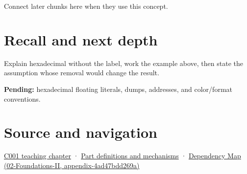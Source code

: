 Connect later chunks here when they use this concept.

\section{Recall and next depth}\label{appendix-6b8075763724-recall-and-next-depth}

Explain hexadecimal without the label, work the example above, then state the assumption whose removal would change the result.

\textbf{Pending:} hexadecimal floating literals, dumps, addresses, and color/format conventions.

\section{Source and navigation}\label{appendix-6b8075763724-source-and-navigation}

\href{Continuous\%20Notes/Computing\%20Foundations\%20-\%20From\%20Bits\%20to\%20C++\%20and\%20Systems\%20APIs\#From\%20a\%20signal\%20to\%20an\%20interpretation}{C001 teaching chapter} · \hyperref[appendix-fd090d982a15]{Part definitions and mechanisms} · \href{../02-Foundations-II/main.pdf\#nameddest=appendix-4ad47bdd269a}{Dependency Map (02-Foundations-II, appendix-4ad47bdd269a)}
